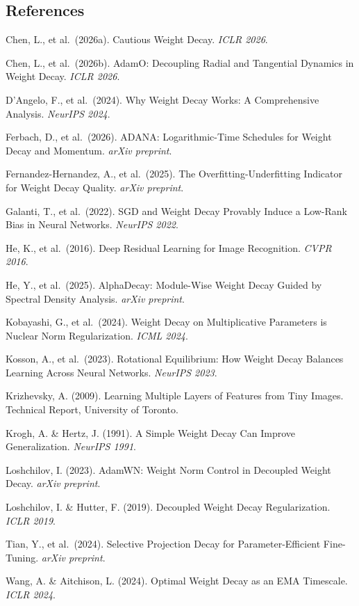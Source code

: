 \documentclass[
]{article}
\begin{document}
\hypertarget{references}{%
\subsection{References}\label{references}}

Chen, L., et al.~(2026a). Cautious Weight Decay. \emph{ICLR 2026}.

Chen, L., et al.~(2026b). AdamO: Decoupling Radial and Tangential
Dynamics in Weight Decay. \emph{ICLR 2026}.

D'Angelo, F., et al.~(2024). Why Weight Decay Works: A Comprehensive
Analysis. \emph{NeurIPS 2024}.

Ferbach, D., et al.~(2026). ADANA: Logarithmic-Time Schedules for Weight
Decay and Momentum. \emph{arXiv preprint}.

Fernandez-Hernandez, A., et al.~(2025). The Overfitting-Underfitting
Indicator for Weight Decay Quality. \emph{arXiv preprint}.

Galanti, T., et al.~(2022). SGD and Weight Decay Provably Induce a
Low-Rank Bias in Neural Networks. \emph{NeurIPS 2022}.

He, K., et al.~(2016). Deep Residual Learning for Image Recognition.
\emph{CVPR 2016}.

He, Y., et al.~(2025). AlphaDecay: Module-Wise Weight Decay Guided by
Spectral Density Analysis. \emph{arXiv preprint}.

Kobayashi, G., et al.~(2024). Weight Decay on Multiplicative Parameters
is Nuclear Norm Regularization. \emph{ICML 2024}.

Kosson, A., et al.~(2023). Rotational Equilibrium: How Weight Decay
Balances Learning Across Neural Networks. \emph{NeurIPS 2023}.

Krizhevsky, A. (2009). Learning Multiple Layers of Features from Tiny
Images. Technical Report, University of Toronto.

Krogh, A. \& Hertz, J. (1991). A Simple Weight Decay Can Improve
Generalization. \emph{NeurIPS 1991}.

Loshchilov, I. (2023). AdamWN: Weight Norm Control in Decoupled Weight
Decay. \emph{arXiv preprint}.

Loshchilov, I. \& Hutter, F. (2019). Decoupled Weight Decay
Regularization. \emph{ICLR 2019}.

Tian, Y., et al.~(2024). Selective Projection Decay for
Parameter-Efficient Fine-Tuning. \emph{arXiv preprint}.

Wang, A. \& Aitchison, L. (2024). Optimal Weight Decay as an EMA
Timescale. \emph{ICLR 2024}.
\end{document}
